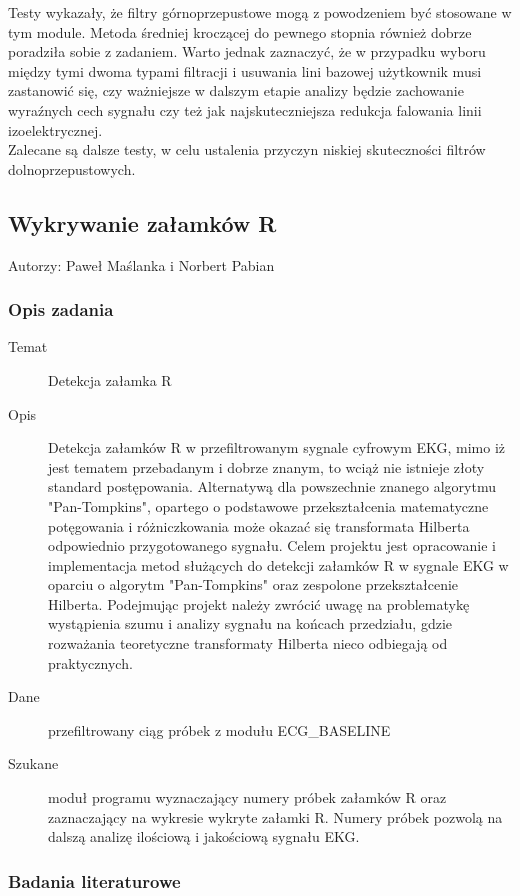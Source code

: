 \documentclass[a4paper, 11pt]{article}
\begin{document}
Testy wykazały, że filtry górnoprzepustowe mogą z powodzeniem być stosowane w tym module. Metoda średniej kroczącej do pewnego stopnia również dobrze poradziła sobie z zadaniem. Warto jednak zaznaczyć, że w przypadku wyboru między tymi dwoma typami filtracji i usuwania lini bazowej użytkownik musi zastanowić się, czy ważniejsze w dalszym etapie analizy będzie zachowanie wyraźnych cech sygnału czy też jak najskuteczniejsza redukcja falowania linii izoelektrycznej.\\

Zalecane są dalsze testy, w celu ustalenia przyczyn niskiej skuteczności filtrów dolnoprzepustowych.


\subsection{Wykrywanie załamków R}
\label{sec:Rs}
Autorzy: Paweł Maślanka i Norbert Pabian

\subsubsection{Opis zadania}
\label{sec:rs:desc}
\begin{description}
\item[Temat] Detekcja załamka R
\item[Opis] Detekcja załamków R w przefiltrowanym sygnale cyfrowym EKG, mimo iż jest tematem przebadanym i dobrze znanym, to wciąż nie istnieje złoty standard postępowania. Alternatywą dla powszechnie znanego algorytmu "Pan-Tompkins", opartego o podstawowe przekształcenia matematyczne potęgowania i różniczkowania może okazać się transformata Hilberta odpowiednio przygotowanego sygnału. Celem projektu jest opracowanie i implementacja metod służących do detekcji załamków R w sygnale EKG w oparciu o algorytm "Pan-Tompkins" oraz zespolone przekształcenie Hilberta. Podejmując projekt należy zwrócić uwagę na problematykę wystąpienia szumu i analizy sygnału na końcach przedziału, gdzie rozważania teoretyczne transformaty Hilberta nieco odbiegają od praktycznych.
\item[Dane] przefiltrowany ciąg próbek z modułu ECG\_BASELINE
\item[Szukane] moduł programu wyznaczający numery próbek załamków R oraz zaznaczający na
wykresie wykryte załamki R. Numery próbek pozwolą na dalszą analizę ilościową
i jakościową sygnału EKG.
\end{description}

\subsubsection{Badania literaturowe}
\label{sec:rs:papers}
\end{document}
